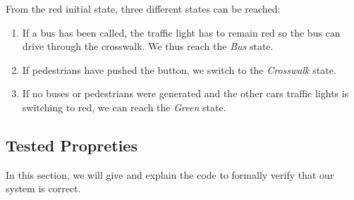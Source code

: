 From the red initial state, three different states can be reached:
\begin{enumerate}
  \item If a bus has been called, the traffic light has to remain red so the bus can drive through the crosswalk. We thus reach the \textit{Bus} state.
  \item If pedestrians have pushed the button, we switch to the \textit{Crosswalk} state.
  \item If no buses or pedestrians were generated and the other cars traffic lights is switching to red, we can reach the \textit{Green} state.
\end{enumerate}

\subsection{Tested Propreties}
In this section, we will give and explain the code to formally verify that our system is correct.

